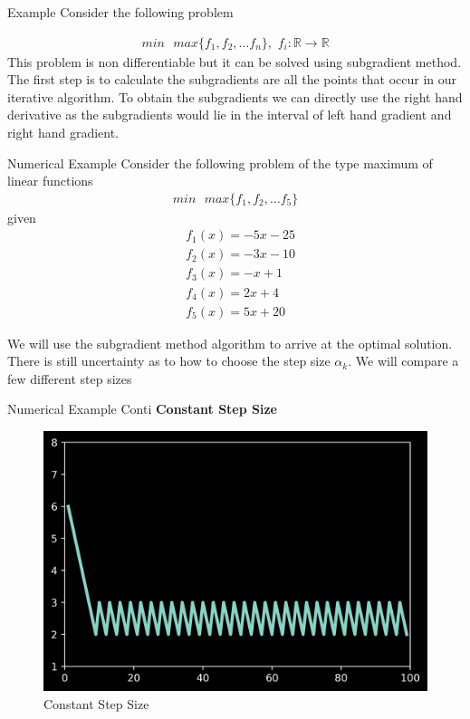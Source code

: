 \documentclass{beamer}
\newcommand\twospace{\,\,}
\newcommand\fourspace{\,\,\,\,}
\begin{document}
\begin{frame}{Example}
Consider the following problem

\begin{align}
    min\fourspace max\{f_1,f_2,\dots f_n\},\twospace f_i : \mathbb{R} \to \mathbb{R}
\end{align}
This problem is non differentiable but it can be solved using subgradient method. The first step is to calculate the subgradients are all the points that occur in our iterative algorithm. To obtain the subgradients we can directly use the right hand derivative as the subgradients would lie in the interval of left hand gradient and right hand gradient.
\end{frame}

\begin{frame}{Numerical Example}
Consider the following problem of the type maximum of linear functions
\begin{align}
    min\fourspace max\{f_1,f_2,\dots f_5\}
\end{align}
given
\begin{align}
    &f_1(x) = -5x-25\nonumber\\
    &f_2(x) = -3x-10\nonumber\\
    &f_3(x) = -x+1 \nonumber\\
    &f_4(x) = 2x+4\nonumber\\
    &f_5(x) = 5x+20 \nonumber
\end{align}
\end{frame}

\begin{frame}{}
    We will use the subgradient method algorithm to arrive at the optimal solution. There is still uncertainty as to how to choose the step size $\alpha_k$. We will compare a few different step sizes
\end{frame}
\begin{frame}{Numerical Example Conti}
    \textbf{Constant Step Size}
    \begin{figure}[H]
        \centering
        \includegraphics[scale=0.5]{../../step/constantstepsize.png}
        \caption{Constant Step Size}
        \label{constantstepsize}
    \end{figure}
\end{frame}
\end{document}
